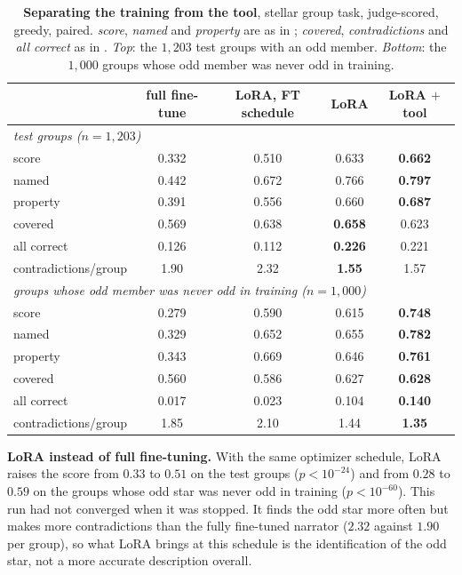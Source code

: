 \begin{table}[h]\centering\small
\caption{\textbf{Separating the training from the tool}, stellar group task, judge-scored,
greedy, paired. \emph{score}, \emph{named} and \emph{property} are as in
; \emph{covered}, \emph{contradictions} and \emph{all correct} as in
. \emph{Top}: the $1{,}203$ test groups with an odd member.
\emph{Bottom}: the $1{,}000$ groups whose odd member was never odd in training.}
\label{tab:chain}
\begin{tabular}{lcccc}
\toprule
 & full fine-tune & LoRA, FT schedule & LoRA & LoRA $+$ tool \\
\midrule
\multicolumn{5}{l}{\emph{test groups ($n=1{,}203$)}}\\
score          & 0.332 & 0.510 & 0.633 & \textbf{0.662} \\
named          & 0.442 & 0.672 & 0.766 & \textbf{0.797} \\
property       & 0.391 & 0.556 & 0.660 & \textbf{0.687} \\
covered        & 0.569 & 0.638 & \textbf{0.658} & 0.623 \\
all correct    & 0.126 & 0.112 & \textbf{0.226} & 0.221 \\
contradictions/group & 1.90 & 2.32 & \textbf{1.55} & 1.57 \\
\midrule
\multicolumn{5}{l}{\emph{groups whose odd member was never odd in training ($n=1{,}000$)}}\\
score          & 0.279 & 0.590 & 0.615 & \textbf{0.748} \\
named          & 0.329 & 0.652 & 0.655 & \textbf{0.782} \\
property       & 0.343 & 0.669 & 0.646 & \textbf{0.761} \\
covered        & 0.560 & 0.586 & 0.627 & \textbf{0.628} \\
all correct    & 0.017 & 0.023 & 0.104 & \textbf{0.140} \\
contradictions/group & 1.85 & 2.10 & 1.44 & \textbf{1.35} \\
\bottomrule
\end{tabular}
\end{table}

\textbf{LoRA instead of full fine-tuning.} With the same optimizer schedule, LoRA raises the
score from $0.33$ to $0.51$ on the test groups ($p<10^{-24}$) and from $0.28$ to $0.59$ on
the groups whose odd star was never odd in training ($p<10^{-60}$). This run had not
converged when it was stopped. It finds the odd star more often but makes more contradictions
than the fully fine-tuned narrator ($2.32$ against $1.90$ per group), so what LoRA brings at
this schedule is the identification of the odd star, not a more accurate description overall.

